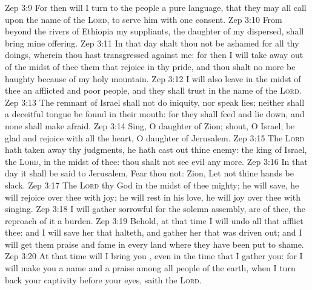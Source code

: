 \vs Zep 3:9 For then will I turn to the people a pure language, that they may all call upon the name of the \textsc{Lord}, to serve him with one consent.
\vs Zep 3:10 From beyond the rivers of Ethiopia my suppliants,  the daughter of my dispersed, shall bring mine offering.
\vs Zep 3:11 In that day shalt thou not be ashamed for all thy doings, wherein thou hast transgressed against me: for then I will take away out of the midst of thee them that rejoice in thy pride, and thou shalt no more be haughty because of my holy mountain.
\vs Zep 3:12 I will also leave in the midst of thee an afflicted and poor people, and they shall trust in the name of the \textsc{Lord}.
\vs Zep 3:13 The remnant of Israel shall not do iniquity, nor speak lies; neither shall a deceitful tongue be found in their mouth: for they shall feed and lie down, and none shall make  afraid.
\vs Zep 3:14 Sing, O daughter of Zion; shout, O Israel; be glad and rejoice with all the heart, O daughter of Jerusalem.
\vs Zep 3:15 The \textsc{Lord} hath taken away thy judgments, he hath cast out thine enemy: the king of Israel,  the \textsc{Lord},  in the midst of thee: thou shalt not see evil any more.
\vs Zep 3:16 In that day it shall be said to Jerusalem, Fear thou not:  Zion, Let not thine hands be slack.
\vs Zep 3:17 The \textsc{Lord} thy God in the midst of thee  mighty; he will save, he will rejoice over thee with joy; he will rest in his love, he will joy over thee with singing.
\vs Zep 3:18 I will gather  sorrowful for the solemn assembly,  are of thee,  the reproach of it  a burden.
\vs Zep 3:19 Behold, at that time I will undo all that afflict thee: and I will save her that halteth, and gather her that was driven out; and I will get them praise and fame in every land where they have been put to shame.
\vs Zep 3:20 At that time will I bring you , even in the time that I gather you: for I will make you a name and a praise among all people of the earth, when I turn back your captivity before your eyes, saith the \textsc{Lord}.
